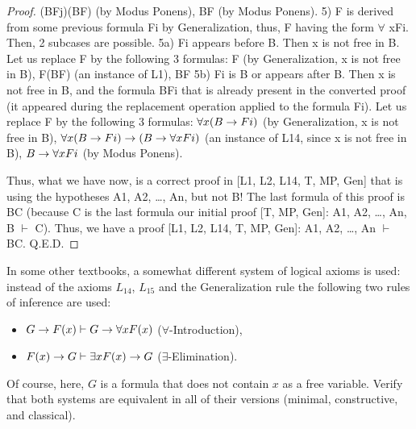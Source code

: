 \begin{proof}
(B\IMPLIES Fj)\IMPLIES (B\IMPLIES F) (by Modus Ponens),
B\IMPLIES F (by Modus Ponens).
5) F is derived from some previous formula Fi by Generalization, thus, F having the form \(\forall\) xFi. Then, 2
subcases are possible.
5a) Fi appears before B. Then x is not free in B. Let us replace F by the following 3 formulas:
F (by Generalization, x is not free in B),
F\IMPLIES (B\IMPLIES F) (an instance of L1),
B\IMPLIES F
5b) Fi is B or appears after B. Then x is not free in B, and the formula B\IMPLIES Fi that is already present in the
converted proof (it appeared during the replacement operation applied to the formula Fi). Let us replace F
by the following 3 formulas:
\(\forall x(B\rightarrow Fi)\) (by Generalization, x is not free in B),
\(\forall x(B\rightarrow Fi)\rightarrow (B\rightarrow \forall xFi)\) (an instance of L14, since x is not free in B),
\(B\rightarrow \forall xFi\) (by Modus Ponens).

Thus, what we have now, is a correct proof in [L1, L2, L14, T, MP, Gen] that is using the hypotheses A1,
A2, \ldots , An, but not B! The last formula of this proof is B\IMPLIES C (because C is the last formula our initial
proof [T, MP, Gen]: A1, A2, \ldots , An, B \(\vdash\) C). Thus, we have a proof [L1, L2, L14, T, MP, Gen]: A1, A2, \ldots ,
An \(\vdash\) B\IMPLIES C. Q.E.D.
\end{proof}

\begin{exercise}
In some other textbooks, a somewhat different system of logical axioms is used: instead of the axioms \(L_{14}\), \(L_{15}\) and the Generalization rule the following two rules of inference are used:
\begin{itemize}
    \item \(G\rightarrow F(x) \vdash G\rightarrow \forall xF(x)\) (\(\forall\)-Introduction),
    \item \(F(x)\rightarrow G \vdash \exists xF(x)\rightarrow G\) (\(\exists\)-Elimination).
\end{itemize}
Of course, here, \(G\) is a formula that does not contain \(x\) as a free variable. Verify that both systems are
equivalent in all of their versions (minimal, constructive, and classical).
\end{exercise}
